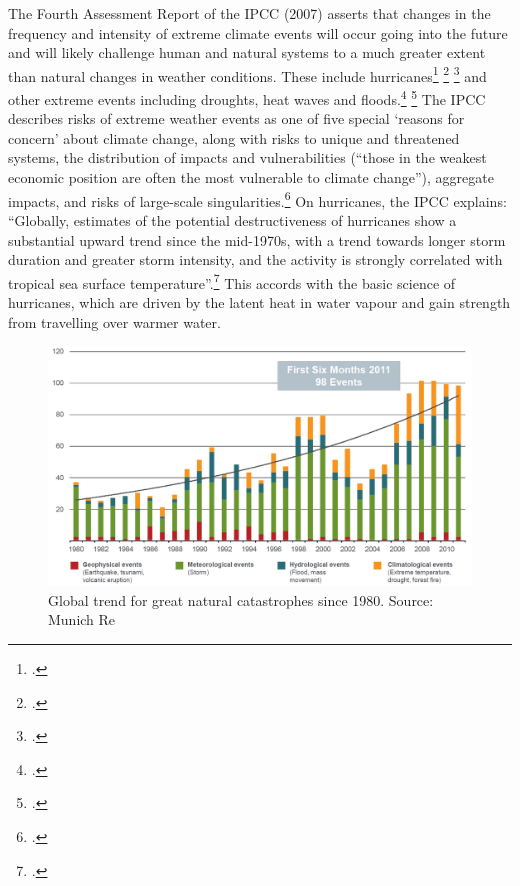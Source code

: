 The Fourth Assessment Report of the IPCC (2007) asserts that changes in the frequency and intensity of extreme climate events will occur going into the future and will likely challenge human and natural systems to a much greater extent than natural changes in weather conditions.
These include hurricanes\footcite[][]{Knutson2004} \footcite[See also: ][]{Villarini2013} \footcite[][]{NATropical} and other extreme events including droughts, heat waves and floods.\footcite[Regarding heat waves, see: ][]{Bumbaco2013} \footcite[][]{HeatwavesQuadruple2013}
The IPCC describes risks of extreme weather events as one of five special `reasons for concern' about climate change, along with risks to unique and threatened systems, the distribution of impacts and vulnerabilities (``those in the weakest economic position are often the most vulnerable to climate change''), aggregate impacts, and risks of large-scale singularities.\footcite[][See: "The long-term perspective" \url{https://www.ipcc.ch/publications_and_data/ar4/syr/en/spms5.html}"]{IPCC2007}
On hurricanes, the IPCC explains: ``Globally, estimates of the potential destructiveness of hurricanes show a substantial upward trend since the mid-1970s, with a trend towards longer storm duration and greater storm intensity, and the activity is strongly correlated with tropical sea surface temperature''.\footcite[][]{IPCCHurricane}
This accords with the basic science of hurricanes, which are driven by the latent heat in water vapour and gain strength from travelling over warmer water.



\begin{figure}
\includegraphics[width=160mm]{s3-munich-cat.png}
\centering
\caption{Global trend for great natural catastrophes since 1980. Source: Munich Re}
\label{fig:s3-munich-cat}
\end{figure}



